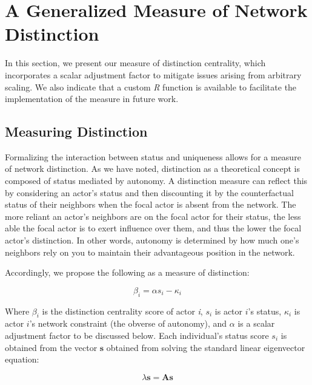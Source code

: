 \documentclass[12pt]{article}
\begin{document}
\section{A Generalized Measure of Network Distinction}
In this section, we present our measure of distinction centrality, which incorporates a scalar adjustment factor to mitigate issues arising from arbitrary scaling. We also indicate that a custom \textit{R} function is available to facilitate the implementation of the measure in future work.

\subsection{Measuring Distinction}

Formalizing the interaction between status and uniqueness allows for a measure of network distinction. As we have noted, distinction as a theoretical concept is composed of status mediated by autonomy. A distinction measure can reflect this by considering an actor's status and then discounting it by the counterfactual status of their neighbors when the focal actor is absent from the network. The more reliant an actor's neighbors are on the focal actor for their status, the less able the focal actor is to exert influence over them, and thus the lower the focal actor's distinction. In other words, autonomy is determined by how much one's neighbors rely on you to maintain their advantageous position in the network. 

Accordingly, we propose the following as a measure of distinction:

\begin{equation}
\beta_i= \alpha s_i - \kappa_i
\label{eq:distinction}
\end{equation}

Where $\beta_i$ is the distinction centrality score of actor \textit{i}, $s_i$ is actor $i$'s status, $\kappa_i$ is actor $i$'s network constraint (the obverse of autonomy), and $\alpha$ is a scalar adjustment factor to be discussed below. Each individual's status score $s_i$ is obtained from the vector $\mathbf{s}$ obtained from solving the standard linear eigenvector equation:

\begin{equation}
\lambda\mathbf{s}= \mathbf{A}\mathbf{s}
\label{eq:eigen}
\end{equation}
\end{document}
